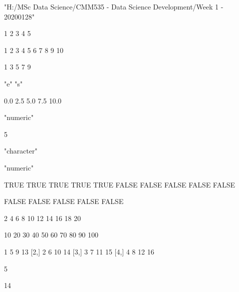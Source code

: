 \documentclass{article}
\begin{document}


\begin{Schunk}
\begin{Soutput}
[1] "H:/MSc Data Science/CMM535 - Data Science Development/Week 1 - 20200128"
\end{Soutput}
\begin{Soutput}
[1] 1 2 3 4 5
\end{Soutput}
\begin{Soutput}
 [1]  1  2  3  4  5  6  7  8  9 10
\end{Soutput}
\begin{Soutput}
[1] 1 3 5 7 9
\end{Soutput}
\begin{Soutput}
[1] "e" "s"
\end{Soutput}
\begin{Soutput}
[1]  0.0  2.5  5.0  7.5 10.0
\end{Soutput}
\begin{Soutput}
[1] "numeric"
\end{Soutput}
\begin{Soutput}
[1] 5
\end{Soutput}
\begin{Soutput}
[1] "character"
\end{Soutput}
\begin{Soutput}
[1] "numeric"
\end{Soutput}
\begin{Soutput}
 [1]  TRUE  TRUE  TRUE  TRUE  TRUE FALSE FALSE FALSE FALSE FALSE
\end{Soutput}
\begin{Soutput}
[1] FALSE FALSE FALSE FALSE FALSE
\end{Soutput}
\begin{Soutput}
 [1]  2  4  6  8 10 12 14 16 18 20
\end{Soutput}
\begin{Soutput}
 [1]  10  20  30  40  50  60  70  80  90 100
\end{Soutput}
\begin{Soutput}
     [,1] [,2] [,3] [,4]
[1,]    1    5    9   13
[2,]    2    6   10   14
[3,]    3    7   11   15
[4,]    4    8   12   16
\end{Soutput}
\begin{Soutput}
[1] 5
\end{Soutput}
\begin{Soutput}
[1] 14
\end{Soutput}
\begin{Soutput}

\end{Soutput}
\end{Schunk}
\end{document}
